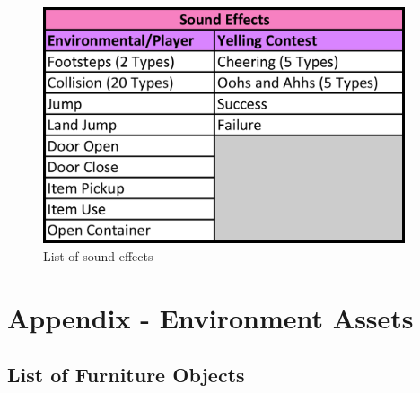 \begin{figure}[H]
\centering
  \caption{List of sound effects}
  \label{fig:sound_effects_list}
  \includegraphics[width=0.95\textwidth, height=0.5\paperheight, keepaspectratio=true]{images/table_sound_effects}
\end{figure}

\clearpage
\chapter{Appendix - Environment Assets}
\section{List of Furniture Objects}


